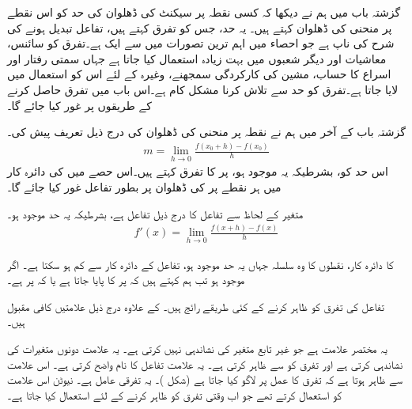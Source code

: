 گزشتہ باب میں ہم نے دیکھا کہ کسی نقطہ پر سیکنٹ کی ڈھلوان کی حد کو اس نقطے پر منحنی کی ڈھلوان کہتے ہیں۔ یہ حد، جس کو تفرق کہتے ہیں، تفاعل تبدیل ہونے کی شرح کی ناپ ہے جو احصاء میں اہم ترین تصورات میں سے ایک ہے۔تفرق کو سائنس، معاشیات اور دیگر شعبوں میں بہت زیادہ استعمال کیا جاتا ہے جہاں سمتی رفتار اور اسراع کا حساب، مشین کی کارکردگی سمجھنے، وغیرہ کے لئے اس کو استعمال میں لایا جاتا ہے۔تفرق کو حد سے تلاش کرنا مشکل کام ہے۔اس باب میں تفرق حاصل کرنے کے طریقوں پر غور کیا جائے گا۔ 

گزشتہ باب کے آخر میں ہم نے نقطہ  پر منحنی  کی ڈھلوان  کی درج ذیل تعریف پیش کی۔
\begin{align*}
m=\lim_{h\to 0}\frac{f(x_0+h)-f(x_0)}{h}
\end{align*} 
اس حد کو، بشرطیکہ یہ موجود ہو،  پر  کا تفرق کہتے ہیں۔اس حصے میں  کی دائرہ کار میں ہر نقطے پر  کی ڈھلوان پر  بطور تفاعل غور کیا جائے گا۔

متغیر  کے لحاظ سے تفاعل  کا  درج ذیل  تفاعل  ہے، بشرطیکہ یہ حد موجود ہو۔
\begin{align*}
f'(x)=\lim_{h\to 0}\frac{f(x+h)-f(x)}{h}
\end{align*}

 کا دائرہ کار، نقطوں کا وہ سلسلہ جہاں یہ حد موجود ہو، تفاعل  کے دائرہ کار سے کم ہو سکتا ہے۔ اگر  موجود ہو تب ہم کہتے ہیں کہ  پر  کا  پایا جاتا ہے یا کہ  پر   ہے۔

تفاعل  کی تفرق کو ظاہر کرنے کے کئی طریقے رائج ہیں۔ کے علاوہ درج ذیل علامتیں کافی مقبول ہیں۔
\begin{description}
 \setlength{\labelsep}{4em}

یہ مختصر علامت ہے جو غیر تابع متغیر کی نشاندہی نہیں کرتی ہے۔
یہ علامت دونوں متغیرات کی نشاندہی کرتی ہے اور تفرق کو  سے ظاہر کرتی ہے۔  
یہ علامت تفاعل کا نام واضح کرتی ہے۔
اس علامت سے ظاہر ہوتا ہے کہ تفرق کا عمل  پر لاگو کیا جاتا ہے (شکل )۔
یہ تفرقی عامل ہے۔
نیوٹن اس علامت کو استعمال کرتے تھے جو اب وقتی تفرق کو ظاہر کرنے کے لئے استعمال کیا جاتا ہے۔
\end{description} 

